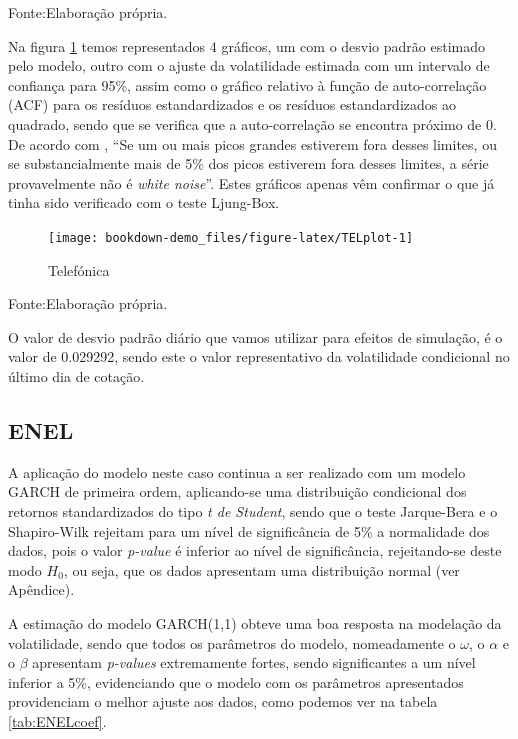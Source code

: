 \documentclass[
  12pt,
  a4paper,
  openany]{book}
\begin{document}
Fonte:Elaboração própria.

\justifying
\bigskip

Na figura \ref{fig:TELplot} temos representados 4 gráficos, um com o desvio padrão estimado pelo modelo, outro com o ajuste da volatilidade estimada com um intervalo de confiança para 95\%, assim como o gráfico relativo à função de auto-correlação (ACF) para os resíduos estandardizados e os resíduos estandardizados ao quadrado, sendo que se verifica que a auto-correlação se encontra próximo de 0. De acordo com \citet{foregeorge}, ``Se um ou mais picos grandes estiverem fora desses limites, ou se substancialmente mais de 5\% dos picos estiverem fora desses limites, a série provavelmente não é \emph{white noise}''. Estes gráficos apenas vêm confirmar o que já tinha sido verificado com o teste Ljung-Box.

\begin{figure}

{\centering \texttt{[image: bookdown-demo\_files/figure-latex/TELplot-1]} 

}

\caption{Telefónica}\label{fig:TELplot}
\end{figure}
\FloatBarrier
\centering

Fonte:Elaboração própria.

\justifying
\bigskip

O valor de desvio padrão diário que vamos utilizar para efeitos de simulação, é o valor de 0.029292, sendo este o valor representativo da volatilidade condicional no último dia de cotação.

\hypertarget{enel}{%
\subsection{ENEL}\label{enel}}

A aplicação do modelo neste caso continua a ser realizado com um modelo GARCH de primeira ordem, aplicando-se uma distribuição condicional dos retornos standardizados do tipo \emph{t de Student}, sendo que o teste Jarque-Bera e o Shapiro-Wilk rejeitam para um nível de significância de 5\% a normalidade dos dados, pois o valor \emph{p-value} é inferior ao nível de significância, rejeitando-se deste modo \(H_0\), ou seja, que os dados apresentam uma distribuição normal (ver Apêndice).

A estimação do modelo GARCH(1,1) obteve uma boa resposta na modelação da volatilidade, sendo que todos os parâmetros do modelo, nomeadamente o \(\omega\), o \(\alpha\) e o \(\beta\) apresentam \emph{p-values} extremamente fortes, sendo significantes a um nível inferior a 5\%, evidenciando que o modelo com os parâmetros apresentados providenciam o melhor ajuste aos dados, como podemos ver na tabela \ref{tab:ENELcoef}.
\end{document}
